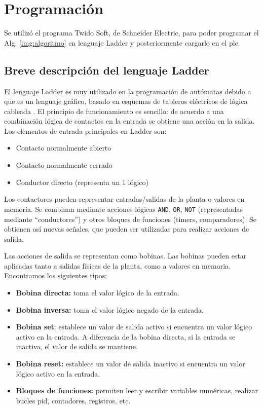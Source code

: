 \section{Programación}
\label{sec:Programacion}
Se utilizó el programa Twido Soft, de Schneider Electric, para poder programar
el Alg. \ref{img:algoritmo} en lenguaje Ladder y posteriormente cargarlo en el
\gls{plc}.

\subsection{Breve descripción del lenguaje Ladder}

El lenguaje Ladder es muy utilizado en la programación de autómatas debido a
que es un lenguaje gráfico, basado en esquemas de tableros eléctricos de
lógica cableada \cite{bib:ApuntesPuglesiPLC}.
El principio de funcionamiento es sencillo: de acuerdo a una combinación
lógica de contactos en la entrada se obtiene una acción en la
salida.
Los elementos de entrada principales en Ladder son:

 \begin{itemize}
  \item Contacto normalmente abierto
  \item Contacto normalmente cerrado
  \item Conductor directo (representa un $1$ lógico)
 \end{itemize}

Los contactores pueden representar entradas/salidas de la
planta o valores en memoria.
Se combinan mediante acciones lógicas \verb|AND|, \verb|OR|, \verb|NOT|
(representadas mediante ``conductores'') y otros bloques de funciones (timers,
comparadores).
Se obtienen así nuevas señales, que pueden ser utilizadas para realizar
acciones de salida.

Las acciones de salida se representan como bobinas.
Las bobinas pueden estar aplicadas tanto a salidas físicas de la planta, como a
valores en memoria. Encontramos los siguientes tipos:

  \begin{itemize}
   \item \textbf{Bobina directa:} toma el valor lógico de la entrada.
   \item \textbf{Bobina inversa:} toma el valor lógico negado de la entrada.
   \item \textbf{Bobina set}: establece un valor de salida activo si encuentra
un valor lógico activo en la entrada. A diferencia de la bobina directa, si la
entrada se inactiva, el valor de salida se mantiene.
   \item \textbf{Bobina reset:} establece un valor de salida inactivo si
encuentra un valor lógico activo en la entrada.
   \item \textbf{Bloques de funciones:} permiten leer y escribir variables
numéricas, realizar bucles \gls{pid}, contadores, registros, etc.
  \end{itemize}
  
